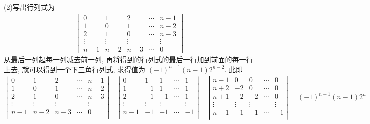\documentclass[../../main.tex]{subfiles}
\begin{document}
\begin{solution}
(2)写出行列式为
\begin{align*}
\begin{vmatrix}
0 & 1 & 2 & \cdots & n - 1 \\
1 & 0 & 1 & \cdots & n - 2 \\
2 & 1 & 0 & \cdots & n - 3 \\
\vdots & \vdots & \vdots & & \vdots \\
n - 1 & n - 2 & n - 3 & \cdots & 0
\end{vmatrix}
\end{align*}
从最后一列起每一列减去前一列, 再将得到的行列式的最后一行加到前面的每一行上去, 就可以得到一个下三角行列式, 求得值为 \((-1)^{n - 1}(n - 1)2^{n - 2}\). 此即
\begin{align*}
\left| \begin{matrix}
0&		1&		2&		\cdots&		n-1\\
1&		0&		1&		\cdots&		n-2\\
2&		1&		0&		\cdots&		n-3\\
\vdots&		\vdots&		\vdots&		&		\vdots\\
n-1&		n-2&		n-3&		\cdots&		0\\
\end{matrix} \right|=\left| \begin{matrix}
0&		1&		1&		\cdots&		1\\
1&		-1&		1&		\cdots&		1\\
2&		-1&		-1&		\cdots&		1\\
\vdots&		\vdots&		\vdots&		&		\vdots\\
n-1&		-1&		-1&		\cdots&		-1\\
\end{matrix} \right|=\left| \begin{matrix}
n-1&		0&		0&		\cdots&		0\\
n+2&		-2&		0&		\cdots&		0\\
n+1&		-2&		-2&		\cdots&		0\\
\vdots&		\vdots&		\vdots&		&		\vdots\\
n-1&		-1&		-1&		\cdots&		-1\\
\end{matrix} \right|=\left( -1 \right) ^{n-1}\left( n-1 \right) 2^{n-2}.
\end{align*}

\end{solution}
\end{document}
